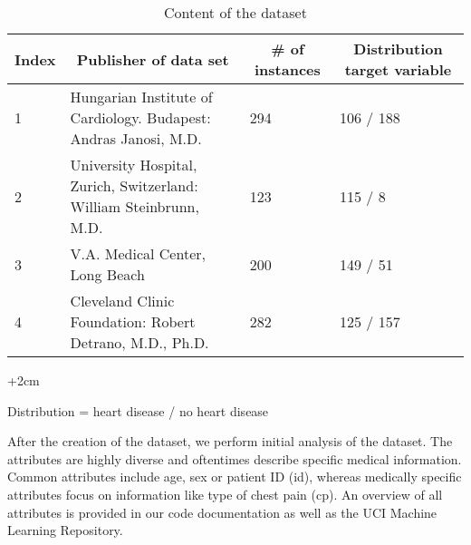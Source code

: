 \begin{table}[]
\begin{adjustwidth}{-2cm}{}
\begin{footnotesize}
\begin{tabular}{|l|l|l|l|}
\hline
\textbf{Index} & \multicolumn{1}{c|}{\textbf{Publisher of data set}}                & \multicolumn{1}{c|}{\textbf{\# of instances}} & \multicolumn{1}{c|}{\textbf{Distribution target variable}} \\ \hline
1              & Hungarian Institute of Cardiology. Budapest: Andras Janosi, M.D.   & 294                                           & 106 / 188                                                                                          \\ \hline
2              & University Hospital, Zurich, Switzerland: William Steinbrunn, M.D. & 123                                           & 115 / 8                                                                                            \\ \hline
3              & V.A. Medical Center, Long Beach                                    & 200                                           & 149 / 51                                                                                           \\ \hline
4              & Cleveland Clinic Foundation: Robert Detrano, M.D., Ph.D.           & 282                                           & 125 / 157                                                                                          \\ \hline
\end{tabular}
\begin{adjustwidth}{+2cm}{}
\begin{center}
\centering
Distribution = heart disease / no heart disease
\end{center}
\end{adjustwidth}

\caption{Content of the dataset} 
\label{table:datasets}
\end{footnotesize}
\end{adjustwidth}
\end{table}


After the creation of the dataset, we perform initial analysis of the dataset. The attributes are highly diverse and oftentimes describe specific medical information. Common attributes include age, sex or patient ID (id), whereas medically specific attributes focus on information like type of chest pain (cp). An overview of all attributes is provided in our code documentation as well as the UCI Machine Learning Repository. 

